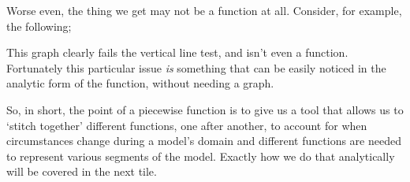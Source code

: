 \documentclass{ximera}
\begin{document}
Worse even, the thing we get may not be a function at all. Consider, for example, the following;

\begin{center}
\end{center}

This graph clearly fails the vertical line test, and isn't even a function. Fortunately this particular issue \textit{is} something that can be easily noticed in the analytic form of the function, without needing a graph.

So, in short, the point of a piecewise function is to give us a tool that allows us to `stitch together' different functions, one after another, to account for when circumstances change during a model's domain and different functions are needed to represent various segments of the model. Exactly how we do that analytically will be covered in the next tile.
\end{document}
